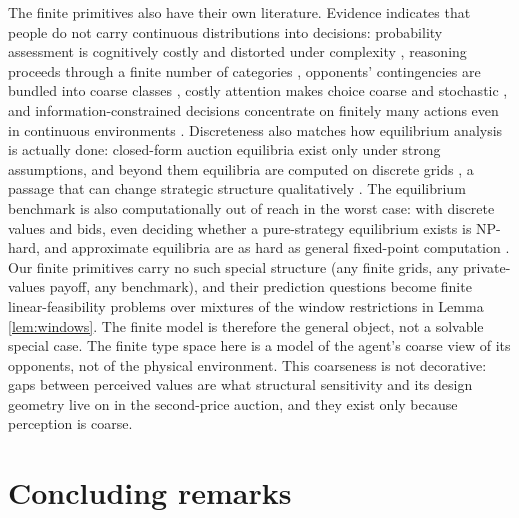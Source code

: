 \documentclass[12pt]{article}
\theoremstyle{definition}
\begin{document}
The finite primitives also have their own literature. Evidence indicates that people do not carry continuous distributions into decisions: probability assessment is cognitively costly and distorted under complexity \citep{enke2023cognitive}, reasoning proceeds through a finite number of categories \citep{mss2008coarse}, opponents' contingencies are bundled into coarse classes \citep{jehiel2005analogy}, costly attention makes choice coarse and stochastic \citep{matejka2015rational}, and information-constrained decisions concentrate on finitely many actions even in continuous environments \citep{jung2019discrete}. Discreteness also matches how equilibrium analysis is actually done: closed-form auction equilibria exist only under strong assumptions, and beyond them equilibria are computed on discrete grids \citep{bichler2025computing}, a passage that can change strategic structure qualitatively \citep{rasooly2020discrete}. The equilibrium benchmark is also computationally out of reach in the worst case: with discrete values and bids, even deciding whether a pure-strategy equilibrium exists is NP-hard, and approximate equilibria are as hard as general fixed-point computation \citep{filosratsikas2023complexity}. Our finite primitives carry no such special structure (any finite grids, any private-values payoff, any benchmark), and their prediction questions become finite linear-feasibility problems over mixtures of the window restrictions in Lemma \ref{lem:windows}. The finite model is therefore the general object, not a solvable special case. The finite type space here is a model of the agent's coarse view of its opponents, not of the physical environment. This coarseness is not decorative: gaps between perceived values are what structural sensitivity and its design geometry live on in the second-price auction, and they exist only because perception is coarse.

\section{Concluding remarks}\label{sec:outlook}
\end{document}
